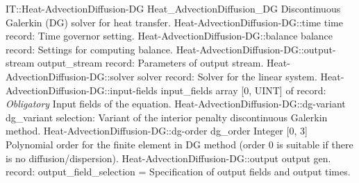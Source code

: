 \begin{RecordType}
	{IT::Heat-AdvectionDiffusion-DG}
	{Heat{\_}AdvectionDiffusion{\_}DG}
	{}%
	{}%
	{{{Discontinuous Galerkin (DG) solver for heat transfer.}%
}}
		\RecKey
			{Heat-AdvectionDiffusion-DG::time}
			{time}
			{{record: }}{}
			{ \ValueDefault{{\{}{\}}}}
			{{{Time governor setting.}%
}}
		\RecKey
			{Heat-AdvectionDiffusion-DG::balance}
			{balance}
			{{record: }}{}
			{ \ValueDefault{{\{}{\}}}}
			{{{Settings for computing balance.}%
}}
		\RecKey
			{Heat-AdvectionDiffusion-DG::output-stream}
			{output{\_}stream}
			{{record: }}{}
			{ \ValueDefault{{\{}{\}}}}
			{{{Parameters of output stream.}%
}}
		\RecKey
			{Heat-AdvectionDiffusion-DG::solver}
			{solver}
			{{record: }}{}
			{ \ValueDefault{{\{}{\}}}}
			{{{Solver for the linear system.}%
}}
		\RecKey
			{Heat-AdvectionDiffusion-DG::input-fields}
			{input{\_}fields}
			{{array [0, UINT] of }{record: }}{}
			{ \it{Obligatory}}
			{{{Input fields of the equation.}%
}}
		\RecKey
			{Heat-AdvectionDiffusion-DG::dg-variant}
			{dg{\_}variant}
			{{selection: }}{}
			{ }
			{{{Variant of the interior penalty discontinuous Galerkin method.}%
}}
		\RecKey
			{Heat-AdvectionDiffusion-DG::dg-order}
			{dg{\_}order}
			{{Integer [0, 3]}}{}
			{ }
			{{{Polynomial order for the finite element in DG method (order 0 is suitable if there is no diffusion/dispersion).}%
}}
		\RecKey
			{Heat-AdvectionDiffusion-DG::output}
			{output}
			{{gen. record: }}{{output{\_}field{\_}selection}{ = }}
			{ }
			{{{Specification of output fields and output times.}%
}}
\end{RecordType}

